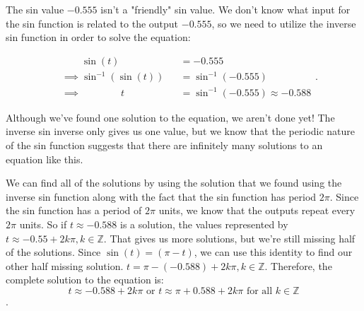 \begin{solution}
	\label{sol:inv_sin_2}

	The sin value $-0.555$ isn't a "friendly" sin value. We don't know what input
	for the sin function is related to the output $-0.555$, so we need to utilize
	the inverse sin function in order to solve the equation:

	\begin{equation*}
		\begin{alignedat}{3}
			&\qquad\sin (t) &&= -0.555 \\
			&\implies \sin^{-1} (\sin (t)) &&= \sin^{-1} (-0.555) \\
			&\implies \qquad\qquad t &&= \sin^{-1} (-0.555) \approx -0.588
		\end{alignedat}
		.\end{equation*}

	Although we've found one solution to the equation, we aren't done yet! The
	inverse sin inverse only gives us one value, but we know that the periodic
	nature of the sin function suggests that there are infinitely many solutions
	to an equation like this.

	We can find all of the solutions by using the solution that we found using the
	inverse sin function along with the fact that the sin function has period
	$2\pi$. Since the sin function has a period of $2\pi$ units, we know that the
	outputs repeat every $2\pi$ units. So if $t \approx -0.588$ is a solution, the
	values represented by $t \approx -0.55 + 2k\pi, k \in \mathbb{Z}$. That gives
	us more solutions, but we're still missing half of the solutions. Since
	$\sin(t) = (\pi - t)$, we can use this identity to find our other half missing
	solution. $t = \pi - (-0.588) + 2k\pi, k \in \mathbb{Z}$. Therefore, the
	complete solution to the equation is:
	\[
		t \approx -0.588 + 2k\pi \textrm{ or } t \approx \pi + 0.588 + 2k\pi
		\textrm{ for all } k \in \mathbb{Z}
	\].
\end{solution}

